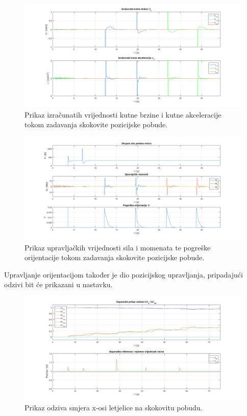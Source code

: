 \documentclass[times, utf8, diplomski]{fer}
\begin{document}
	\newpage
	\clearpage
	
	\begin{figure}[!h]
		\includegraphics[width=\textwidth]{plots/pos_alpha_omega2.png}
		\caption{Prikaz izračunatih vrijednosti kutne brzine i kutne  akceleracije  tokom zadavanja skokovite pozicijske pobude.}
	\end{figure}
	
	\begin{figure}[h!]
		\includegraphics[width=\textwidth]{plots/pos_force_moments2.png}
		\caption{Prikaz upravljačkih vrijednosti sila i momenata te pogreške orijentacije tokom zadavanja skokovite pozicijske pobude.}
	\end{figure}
	
	Upravljanje orijentacijom također je dio pozicijskog upravljanja, pripadajući odzivi bit će prikazani u nastavku.
	
	\newpage
	\clearpage
	
	\begin{figure}[h!]
		\includegraphics[width=\textwidth]{plots/b1d_b1d2.png}
		\caption{Prikaz odziva smjera x-osi letjelice na skokovitu pobudu.}
	\end{figure}
\end{document}
